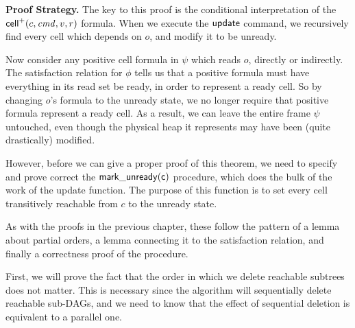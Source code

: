 \textbf{Proof Strategy.} The key to this proof is the conditional
interpretation of the $\mathsf{cell}^{+}({c}, {\mathit{cmd}}, {v}, {r})$ formula. When we execute
the $\mathsf{update}$ command, we recursively find every cell which
depends on $o$, and modify it to be unready.

Now consider any positive cell formula in $\psi$ which reads $o$,
directly or indirectly. The satisfaction relation for $\phi$ tells us
that a positive formula must have everything in its read set be ready,
in order to represent a ready cell. So by changing $o$'s formula to
the unready state, we no longer require that positive formula
represent a ready cell. As a result, we can leave the entire frame
$\psi$ untouched, even though the physical heap it represents may have
been (quite drastically) modified.

However, before we can give a proper proof of this theorem, we need to
specify and prove correct the $\mathsf{mark\_unready(c)}$ procedure,
which does the bulk of the work of the update function. The purpose of
this function is to set every cell transitively reachable from $c$ to
the unready state.

As with the proofs in the previous chapter, these follow the pattern 
of a lemma about partial orders, a lemma connecting it to the satisfaction
relation, and finally a correctness proof of the procedure. 

First, we will prove the fact that the order in which we delete
reachable subtrees does not matter. This is necessary since the 
algorithm will sequentially delete reachable sub-DAGs, and we
need to know that the effect of sequential deletion is equivalent
to a parallel one.  




